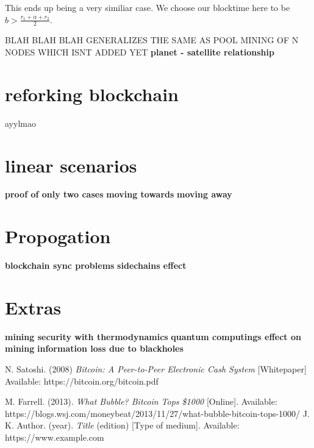 \documentclass[conference]{IEEEtran}
\begin{document}
This ends up being a very similiar case. We choose our blocktime here to be $b > \frac{r_1 + \alpha + r_2}{2}$.

BLAH BLAH BLAH GENERALIZES THE SAME AS POOL MINING OF N NODES WHICH ISNT ADDED YET
\textbf{planet - satellite relationship}

\begin{center}
\end{center}

\section{reforking blockchain}
ayylmao

\section{linear scenarios}
\textbf{proof of only two cases}
\lipsum[1-2]
\textbf{moving towards}
\lipsum[1-3]
\textbf{moving away}
\lipsum[1-3]
\section{Propogation}
\textbf{blockchain sync problems}
\lipsum[1-2]
\textbf{sidechains effect}
\lipsum[1-2]

\section{Extras}
\textbf{mining security with thermodynamics}
\lipsum[1-2]
\textbf{quantum computings effect on mining}
\lipsum[1-2]
\textbf{information loss due to blackholes}
\lipsum[1-3]


\begin{thebibliography}{9}
	
	N. Satoshi. 
	(2008)
	\textit{Bitcoin: A Peer-to-Peer Electronic Cash System}
	[Whitepaper]
	Available: https://bitcoin.org/bitcoin.pdf

	M. Farrell. 
	(2013).	
	\textit{What Bubble? Bitcoin Tops \$1000}
	[Online].
	Available: https://blogs.wsj.com/moneybeat/2013/11/27/what-bubble-bitcoin-tops-1000/
	J. K. Author. 
	(year).	
	\textit{Title}
	(edition)
	[Type of medium].
	Available: https://www.example.com
\end{thebibliography}
\end{document}
